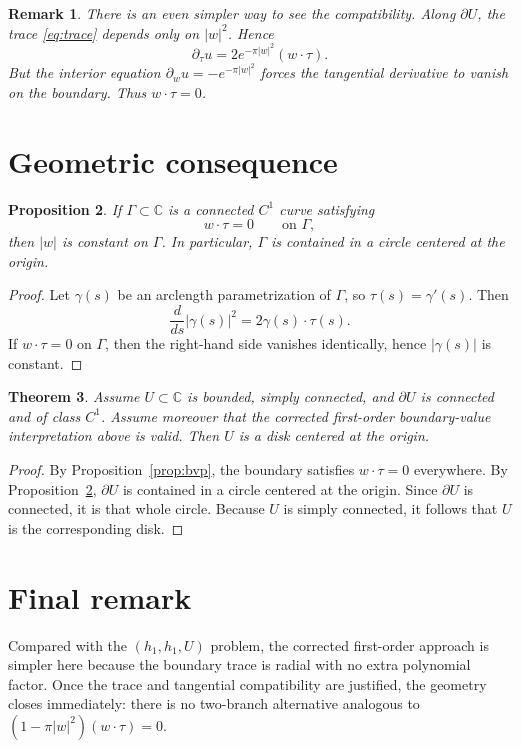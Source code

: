 \documentclass[11pt]{article}
\newtheorem{theorem}{Theorem}[section]
\newtheorem{proposition}[theorem]{Proposition}
\newtheorem{remark}[theorem]{Remark}
\newcommand{\C}{\mathbb C}
\newcommand{\1}{\mathbf 1}
\newcommand{\pw}{\partial_w}
\begin{document}
\begin{remark}
There is an even simpler way to see the compatibility. Along \(\partial U\), the trace
\eqref{eq:trace} depends only on \(|w|^2\). Hence
\[
\partial_\tau u=2e^{-\pi|w|^2}(w\cdot \tau).
\]
But the interior equation \(\pw u=-e^{-\pi|w|^2}\) forces the tangential derivative to vanish on
the boundary. Thus \(w\cdot \tau=0\).
\end{remark}

\section{Geometric consequence}

\begin{proposition}\label{prop:circle}
If \(\Gamma\subset \C\) is a connected \(C^1\) curve satisfying
\[
w\cdot \tau=0
\qquad \text{on }\Gamma,
\]
then \(|w|\) is constant on \(\Gamma\). In particular, \(\Gamma\) is contained in a circle
centered at the origin.
\end{proposition}

\begin{proof}
Let \(\gamma(s)\) be an arclength parametrization of \(\Gamma\), so \(\tau(s)=\gamma'(s)\). Then
\[
\frac{d}{ds}|\gamma(s)|^2=2\gamma(s)\cdot \tau(s).
\]
If \(w\cdot \tau=0\) on \(\Gamma\), then the right-hand side vanishes identically, hence
\(|\gamma(s)|\) is constant.
\end{proof}

\begin{theorem}\label{thm:disk}
Assume \(U\subset \C\) is bounded, simply connected, and \(\partial U\) is connected and of class
\(C^1\). Assume moreover that the corrected first-order boundary-value interpretation above is
valid. Then \(U\) is a disk centered at the origin.
\end{theorem}

\begin{proof}
By Proposition~\ref{prop:bvp}, the boundary satisfies \(w\cdot \tau=0\) everywhere. By
Proposition~\ref{prop:circle}, \(\partial U\) is contained in a circle centered at the origin.
Since \(\partial U\) is connected, it is that whole circle. Because \(U\) is simply connected, it
follows that \(U\) is the corresponding disk.
\end{proof}

\section{Final remark}

Compared with the \((h_1,h_1,U)\) problem, the corrected first-order approach is simpler here
because the boundary trace is radial with no extra polynomial factor. Once the trace and
tangential compatibility are justified, the geometry closes immediately: there is no two-branch
alternative analogous to \((1-\pi|w|^2)(w\cdot \tau)=0\).
\end{document}
